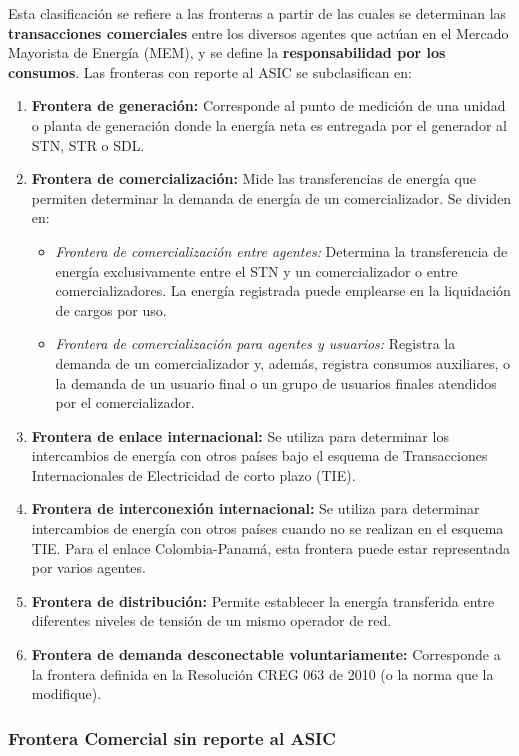 \documentclass[a5paper]{book}%
\begin{document}
Esta clasificación se refiere a las fronteras a partir de las cuales se determinan las \textbf{transacciones comerciales} entre los diversos agentes que actúan en el Mercado Mayorista de Energía (MEM), y se define la \textbf{responsabilidad por los consumos}. Las fronteras con reporte al ASIC se subclasifican en:

\begin{enumerate}
	\item \textbf{Frontera de generación:} Corresponde al punto de medición de una unidad o planta de generación donde la energía neta es entregada por el generador al STN, STR o SDL.
	\item \textbf{Frontera de comercialización:} Mide las transferencias de energía que permiten determinar la demanda de energía de un comercializador. Se dividen en:
	\begin{itemize}
	\item \textit{Frontera de comercialización entre agentes:} Determina la transferencia de energía exclusivamente entre el STN y un comercializador o entre comercializadores. La energía registrada puede emplearse en la liquidación de cargos por uso.
	\item \textit{Frontera de comercialización para agentes y usuarios:} Registra la demanda de un comercializador y, además, registra consumos auxiliares, o la demanda de un usuario final o un grupo de usuarios finales atendidos por el comercializador.
	\end{itemize}
	\item \textbf{Frontera de enlace internacional:} Se utiliza para determinar los intercambios de energía con otros países bajo el esquema de Transacciones Internacionales de Electricidad de corto plazo (TIE).
	\item \textbf{Frontera de interconexión internacional:} Se utiliza para determinar intercambios de energía con otros países cuando no se realizan en el esquema TIE. Para el enlace Colombia-Panamá, esta frontera puede estar representada por varios agentes.
	\item \textbf{Frontera de distribución:} Permite establecer la energía transferida entre diferentes niveles de tensión de un mismo operador de red.
	\item \textbf{Frontera de demanda desconectable voluntariamente:} Corresponde a la frontera definida en la Resolución CREG 063 de 2010 (o la norma que la modifique).
\end{enumerate}

\subsubsection{Frontera Comercial sin reporte al ASIC}
\end{document}

